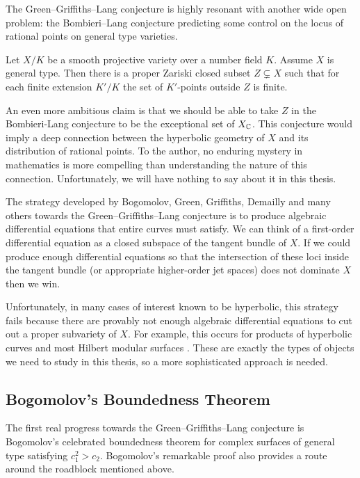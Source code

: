 \documentclass[main.tex]{subfiles}
\begin{document}
The Green--Griffiths--Lang conjecture is highly resonant with another wide open problem: the Bombieri--Lang conjecture predicting some control on the locus of rational points on general type varieties.

\begin{conj}
Let $X / K$ be a smooth projective variety over a number field $K$. Assume $X$ is general type. Then there is a proper Zariski closed subset $Z \subsetneq X$ such that for each finite extension $K' / K$ the set of $K'$-points outside $Z$ is finite.   
\end{conj}

An even more ambitious claim is that we should be able to take $Z$ in the Bombieri-Lang conjecture to be the exceptional set of $X_{\mathbb{C}}$. This conjecture would imply a deep connection between the hyperbolic geometry of $X$ and its distribution of rational points. To the author, no enduring mystery in mathematics is more compelling than understanding the nature of this connection. Unfortunately, we will have nothing to say about it in this thesis. 
\par 
The strategy developed by Bogomolov, Green, Griffiths, Demailly and many others towards the Green--Griffiths--Lang conjecture is to produce algebraic differential equations that entire curves must satisfy. We can think of a first-order differential equation as a closed subspace of the tangent bundle of $X$. If we could produce enough differential equations so that the intersection of these loci inside the tangent bundle (or appropriate higher-order jet spaces) does not dominate $X$ then we win.

Unfortunately, in many cases of interest known to be hyperbolic, this strategy fails because there are provably not enough algebraic differential equations to cut out a proper subvariety of $X$. For example, this occurs for products of hyperbolic curves and most Hilbert modular surfaces \cite{diverio_rousseau:exceptional_set_neq_GGL}. These are exactly the types of objects we need to study in this thesis, so a more sophisticated approach is needed. 

\subsection{Bogomolov's Boundedness Theorem} \label{section:bogomolov_strategy}

The first real progress towards the Green--Griffiths--Lang conjecture is Bogomolov's celebrated boundedness theorem for complex surfaces of general type satisfying $c_1^2 > c_2$. Bogomolov's remarkable proof also provides a route around the roadblock mentioned above.
\end{document}

